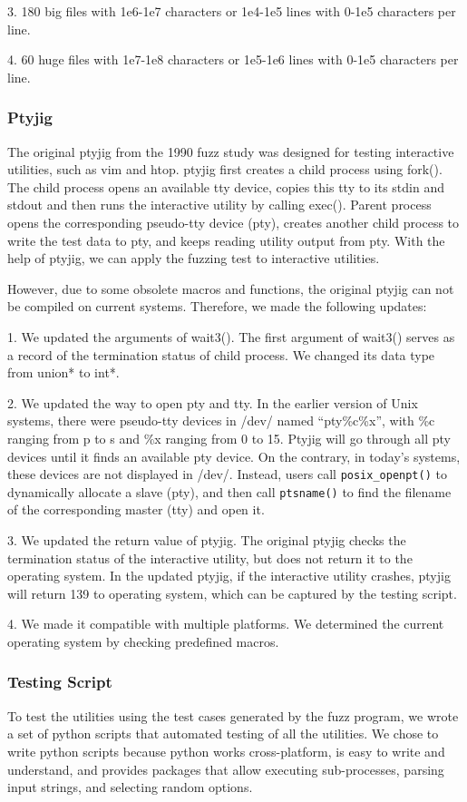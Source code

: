 3. 180 big files with 1e6-1e7 characters or 1e4-1e5 lines with 0-1e5 characters per line.

4. 60 huge files with 1e7-1e8 characters or 1e5-1e6 lines with 0-1e5 characters per line.  

\subsubsection{Ptyjig}
The original ptyjig from the 1990 fuzz study was designed for testing interactive utilities, such as vim and htop. ptyjig first creates a child process using fork(). The child process opens an available tty device, copies this tty to its stdin and stdout and then runs the interactive utility by calling exec(). Parent process opens the corresponding pseudo-tty device (pty), creates another child process to write the test data to pty, and keeps reading utility output from pty. With the help of ptyjig, we can apply the fuzzing test to interactive utilities.

However, due to some obsolete macros and functions, the original ptyjig can not be compiled on current systems. Therefore, we made the following updates:

1. We updated the arguments of wait3(). The first argument of wait3() serves as a record of the termination status of child process. We changed its data type from union* to int*.

2. We updated the way to open pty and tty. In the earlier version of Unix systems, there were pseudo-tty devices in /dev/ named “pty\%c\%x”, with \%c ranging from p to s and \%x ranging from 0 to 15. Ptyjig will go through all pty devices until it finds an available pty device. On the contrary, in today’s systems, these devices are not displayed in /dev/. Instead, users call \texttt{posix\_openpt()} to dynamically allocate a slave (pty), and then call \texttt{ptsname()} to find the filename of the corresponding master (tty) and open it.

3. We updated the return value of ptyjig. The original ptyjig checks the termination status of the interactive utility, but does not return it to the operating system. In the updated ptyjig, if the interactive utility crashes, ptyjig will return 139 to operating system, which can be captured by the testing script.

4. We made it compatible with multiple platforms. We determined the current operating system by checking predefined macros.


\subsubsection{Testing Script}
To test the utilities using the test cases generated by the fuzz program, we wrote a set of python scripts that automated testing of all the utilities. We chose to write python scripts because python works cross-platform, is easy to write and understand, and provides packages that allow executing sub-processes, parsing input strings, and selecting random options.

